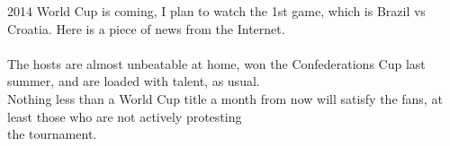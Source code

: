 \documentclass[10pt]{article}
\begin{document}
\fontsize{9pt}{2.5ex}\selectfont
\small
2014 World Cup is coming, I plan to watch the 1st game, which is Brazil
vs Croatia. Here is a piece of news from the Internet.\hfil
\\\\
The hosts are almost unbeatable at home, won the Confederations Cup last summer, and are loaded with talent, as usual.\\\hfil Nothing less than a World Cup title a month from now will satisfy the fans, at least those who are not actively protesting\\\hfil the tournament.
\end{document}
